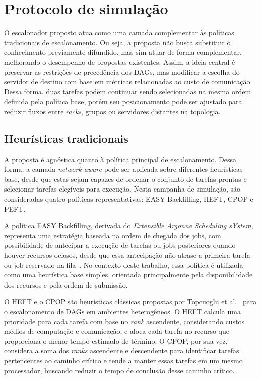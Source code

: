 \documentclass[12pt]{article}
\begin{document}
\section{Protocolo de simulação}
\label{sec:protocolo_simulacao}

O escalonador proposto atua como uma camada complementar às políticas tradicionais de escalonamento. 
%
Ou seja, a proposta não busca substituir o conhecimento previamente difundido, mas sim atuar de forma complementar, melhorando o desempenho de propostas existentes.
%
Assim, a ideia central é preservar as restrições de precedência dos DAGs, mas modificar a escolha do servidor de destino com base em métricas relacionadas ao custo de comunicação. 
%
Dessa forma, duas tarefas podem continuar sendo selecionadas na mesma ordem definida pela política base, porém seu posicionamento pode ser ajustado para reduzir fluxos entre \textit{racks}, grupos ou servidores distantes na topologia.


\subsection{Heurísticas tradicionais}
\label{subsec:politicas_base}

A proposta é agnóstica quanto à política principal de escalonamento. 
%
Dessa forma, a camada \textit{network-aware} pode ser aplicada sobre diferentes heurísticas base, desde que estas sejam capazes de ordenar o conjunto de tarefas prontas e selecionar tarefas elegíveis para execução. 
%
Nesta campanha de simulação, são consideradas quatro políticas representativas: EASY Backfilling, HEFT, CPOP e PEFT.

A política EASY Backfilling, derivada do \textit{Extensible Argonne Scheduling sYstem}, representa uma estratégia baseada na ordem de chegada dos jobs, com possibilidade de antecipar a execução de tarefas ou jobs posteriores quando houver recursos ociosos, desde que essa antecipação não atrase a primeira tarefa ou job reservado na fila~\cite{lifka1995anl}. 
%
No contexto deste trabalho, essa política é utilizada como uma heurística base simples, orientada principalmente pela disponibilidade dos recursos e pela ordem de submissão.

O HEFT e o CPOP são heurísticas clássicas propostas por Topcuoglu et al.~\cite{topcuoglu2002performance} para o escalonamento de DAGs em ambientes heterogêneos. 
%
O HEFT calcula uma prioridade para cada tarefa com base no \textit{rank} ascendente, considerando custos médios de computação e comunicação, e aloca cada tarefa no recurso que proporciona o menor tempo estimado de término. 
%
O CPOP, por sua vez, considera a soma dos \textit{ranks} ascendente e descendente para identificar tarefas pertencentes ao caminho crítico e tende a manter essas tarefas em um mesmo processador, buscando reduzir o tempo de conclusão desse caminho crítico.
\end{document}
